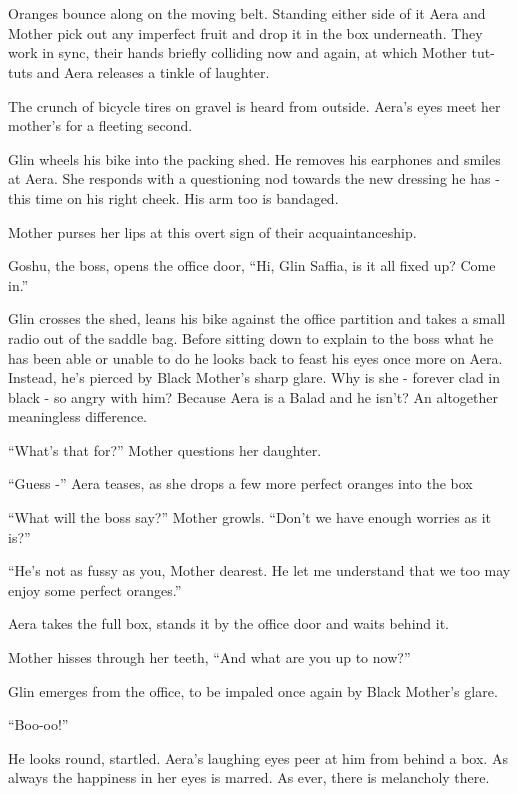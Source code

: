 \documentclass[twoside,11pt]{book}
\begin{document}
\bigskip

\chapter{}

Oranges bounce along on the moving belt. Standing either side of it Aera and Mother pick out any imperfect fruit and
drop it in the box underneath. They work in sync, their hands briefly colliding now and again, at which Mother tut-tuts
and Aera releases a tinkle of laughter.

The crunch of bicycle tires on gravel is heard from outside. Aera's eyes meet her mother's for a fleeting second.

Glin wheels his bike into the packing shed. He removes his earphones and smiles at Aera. She responds with a questioning
nod towards the new dressing he has - this time on his right cheek. His arm too is bandaged.

Mother purses her lips at this overt sign of their acquaintanceship.

Goshu, the boss, opens the office door, ``Hi, Glin Saffia, is it all fixed up? Come in.''

Glin crosses the shed, leans his bike against the office partition and takes a small radio out of the saddle bag. Before
sitting down to explain to the boss what he has been able or unable to do he looks back to feast his eyes once more on
Aera. Instead, he's pierced by Black Mother's sharp glare. Why is she - forever clad in black - so angry with him?
Because Aera is a Balad and he isn't? An altogether meaningless difference.

``What's that for?'' Mother questions her daughter.

``Guess -'' Aera teases, as she drops a few more perfect oranges into the box

``What will the boss say?'' Mother growls. ``Don't we have enough worries as it
is?''

``He's not as fussy as you, Mother dearest. He let me understand that we too may enjoy some perfect
oranges.''

Aera takes the full box, stands it by the office door and waits behind it.

Mother hisses through her teeth, ``And what are you up to now?''

Glin emerges from the office, to be impaled once again by Black Mother's glare.

``Boo-oo!''

He looks round, startled. Aera's laughing eyes peer at him from behind a box. As always the happiness in her eyes is
marred. As ever, there is melancholy there.
\end{document}
